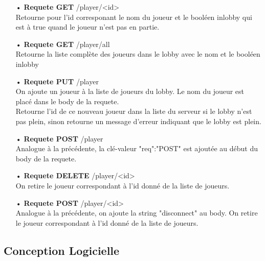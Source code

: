 \begin{itemize}
         \item[•]  \textbf{Requete GET}    /player/<id>\\
Retourne pour l'id corresponant le nom du joueur et le 
booléen inlobby qui est à true quand le joueur n'est pas en 
partie.

         \item[•]  \textbf{Requete GET}    /player/all\\
Retourne la liste complète des joueurs dans le lobby avec le
nom et le booléen inlobby

         \item[•]  \textbf{Requete PUT}    /player\\
On ajoute un joueur à la liste de joueurs du lobby. Le nom 
du joueur est placé dans le body de la requete. 
\\Retourne l'id de ce nouveau joueur dans la liste du 
serveur si le lobby n'est pas plein, sinon retourne un 
message d'erreur indiquant que le lobby est plein.

         \item[•]  \textbf{Requete POST}   /player\\
Analogue à la précédente, la clé-valeur "req":"POST" est 
ajoutée au début du body de la requete. 

         \item[•]  \textbf{Requete DELETE} /player/<id>\\
On retire le joueur correspondant à l'id donné de la liste
de joueurs. 

         \item[•]  \textbf{Requete POST}   /player/<id>\\
Analogue à la précédente, on ajoute la string "disconnect" 
au body. On retire le joueur correspondant à l'id 
donné de la liste de joueurs. 
\end{itemize}

\subsection{Conception Logicielle}

